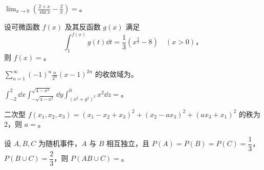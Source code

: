 \begin{question}[index=11]
$\displaystyle\lim_{x\to0}\left(\frac{2+x}{\sin x}-\frac2x\right)=$\fillin。
\end{question}
\QuestionBreak

\begin{question}[index=12]
设可微函数 $f(x)$ 及其反函数 $g(x)$ 满足
\[
\int_1^{f(x)}g(t)\dd t=\frac13\left(x^{\frac32}-8\right)\quad(x>0)\text{，}
\]
则 $f(x)=$\fillin。
\end{question}
\QuestionBreak

\begin{question}[index=13]
$\displaystyle\sum_{n=1}^{\infty}(-1)^n\frac{n}{2^n}(x-1)^{2n}$ 的收敛域为\fillin。
\end{question}
\QuestionBreak

\begin{question}[index=14]
$\displaystyle\int_{-2}^2\dd x\int_{-\sqrt{4-x^2}}^{\sqrt{4-x^2}}\dd y
\int_{(x^2+y^2)^2}^0 x^2\dd z=$\fillin。
\end{question}
\QuestionBreak

\begin{question}[index=15]
二次型 $f(x_1,x_2,x_3)=(x_1-x_2+x_3)^2+(x_2-ax_3)^2+(ax_3+x_1)^2$ 的秩为 $2$，则 $a=$\fillin。
\end{question}
\QuestionBreak

\begin{question}[index=16]
设 $A,B,C$ 为随机事件，$A$ 与 $B$ 相互独立，且 $P(A)=P(B)=P(C)=\dfrac13$，$P(B\cup C)=\dfrac23$，则 $P(AB\cup C)=$\fillin。
\end{question}
